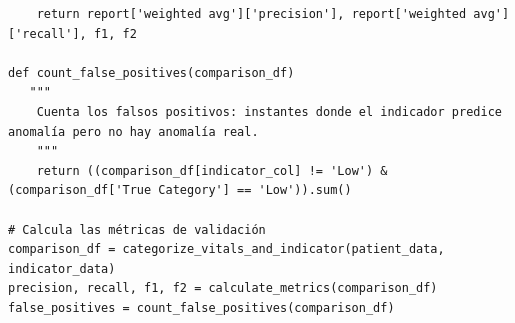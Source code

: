 \begin{verbatim}
    return report['weighted avg']['precision'], report['weighted avg']['recall'], f1, f2

def count_false_positives(comparison_df)
   """
    Cuenta los falsos positivos: instantes donde el indicador predice anomalía pero no hay anomalía real.
    """
    return ((comparison_df[indicator_col] != 'Low') & (comparison_df['True Category'] == 'Low')).sum()

# Calcula las métricas de validación
comparison_df = categorize_vitals_and_indicator(patient_data, indicator_data)
precision, recall, f1, f2 = calculate_metrics(comparison_df)
false_positives = count_false_positives(comparison_df)
\end{verbatim}